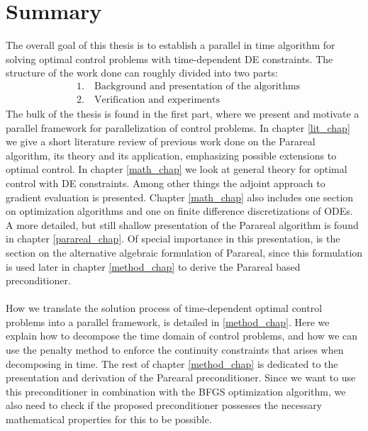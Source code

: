 \section{Summary}
The overall goal of this thesis is to establish a parallel in time algorithm for solving optimal control problems with time-dependent DE constraints. The structure of the work done can roughly divided into two parts:
\begin{align*}
&1.\quad \textrm{Background and presentation of the algorithms} \\
&2.\quad \textrm{Verification and experiments}
\end{align*}
The bulk of the thesis is found in the first part, where we present and motivate a parallel framework for parallelization of control problems. In chapter \ref{lit_chap} we give a short literature review of previous work done on the Parareal algorithm, its theory and its application, emphasizing possible extensions to optimal control. In chapter \ref{math_chap} we look at general theory for optimal control with DE constraints. Among other things the adjoint approach to gradient evaluation is presented. Chapter \ref{math_chap} also includes one section on optimization algorithms and one on finite difference discretizations of ODEs. A more detailed, but still shallow presentation of the Parareal algorithm is found in chapter \ref{parareal_chap}. Of special importance in this presentation, is the section on the alternative algebraic formulation of Parareal, since this formulation is used later in chapter \ref{method_chap} to derive the Parareal based preconditioner.
\\
\\
How we translate the solution process of time-dependent optimal control problems into a parallel framework, is detailed in \ref{method_chap}. Here we explain how to decompose the time domain of control problems, and how we can use the penalty method to enforce the continuity constraints that arises when decomposing in time. The rest of chapter \ref{method_chap} is dedicated to the presentation and derivation of the Parearal preconditioner. Since we want to use this preconditioner in combination with the BFGS optimization algorithm, we also need to check if the proposed preconditioner possesses the necessary mathematical properties for this to be possible. 
\\
\\
